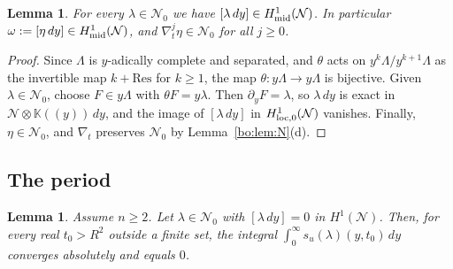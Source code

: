 \documentclass[11pt,a4paper]{article}
\newtheorem{lemma}[theorem]{Lemma}
\theoremstyle{definition}
\theoremstyle{remark}
\numberwithin{equation}{section}
\newcommand{\Kt}{\mathbb{K}}
\newcommand{\cN}{\mathcal{N}}
\begin{document}
\begin{lemma}\label{bo:lem:localexact}
For every $\lambda\in\cN_0$ we have $[\lambda\,dy]\in H^1_{\rm mid}(\cN)$. In particular $\omega:=[\eta\,dy]\in H^1_{\rm mid}(\cN)$, and $\nabla_t^j\eta\in\cN_0$ for all $j\ge0$.
\end{lemma}

\begin{proof}
Since $\Lambda$ is $y$-adically complete and separated, and $\theta$ acts on $y^k\Lambda/y^{k+1}\Lambda$ as the invertible map $k+\mathrm{Res}$ for $k\ge1$, the map $\theta:y\Lambda\to y\Lambda$ is bijective. Given $\lambda\in\cN_0$, choose $F\in y\Lambda$ with $\theta F=y\lambda$. Then $\partial_yF=\lambda$, so $\lambda\,dy$ is exact in $\cN\otimes \Kt((y))\,dy$, and the image of $[\lambda\,dy]$ in $H^1_{\rm loc,0}(\cN)$ vanishes. Finally, $\eta\in\cN_0$, and $\nabla_t$ preserves $\cN_0$ by Lemma~\ref{bo:lem:N}(d).
\end{proof}

\subsection{The period}

\begin{lemma}\label{bo:lem:cycle}
Assume $n\ge2$. Let $\lambda\in\cN_0$ with $[\lambda\,dy]=0$ in $H^1(\cN)$. Then, for every real $t_0>R^2$ outside a finite set, the integral $\int_0^\infty s_u(\lambda)(y,t_0)\,dy$ converges absolutely and equals $0$.
\end{lemma}
\end{document}
